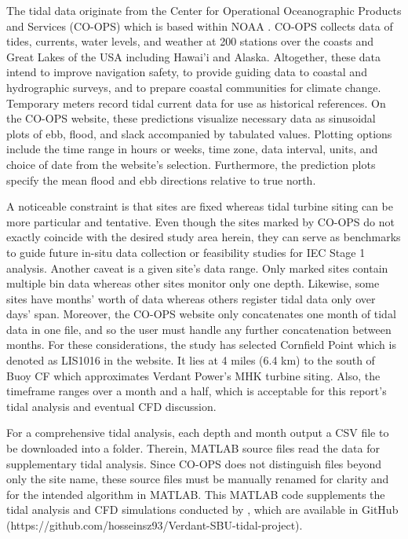 \documentclass[12pt,sort&compress]{elsarticle}
\theoremstyle{definition}%
\begin{document}
The tidal data originate from the Center for Operational Oceanographic Products and Services (CO-OPS) which is based within NOAA \cite{coops_map}. CO-OPS collects data of tides, currents, water levels, and weather at 200 stations over the coasts and Great Lakes of the USA including Hawai'i and Alaska. Altogether, these data intend to improve navigation safety, to provide guiding data to coastal and hydrographic surveys, and to prepare coastal communities for climate change. Temporary meters record tidal current data for use as historical references. On the CO-OPS website, these predictions visualize necessary data as sinusoidal plots of ebb, flood, and slack accompanied by tabulated values. Plotting options include the time range in hours or weeks, time zone, data interval, units, and choice of date from the website's selection. Furthermore, the prediction plots specify the mean flood and ebb directions relative to true north.

A noticeable constraint is that sites are fixed whereas tidal turbine siting can be more particular and tentative. Even though the sites marked by CO-OPS do not exactly coincide with the desired study area herein, they can serve as benchmarks to guide future in-situ data collection or feasibility studies for IEC Stage 1 analysis. Another caveat is a given site's data range. Only marked sites contain multiple bin data whereas other sites monitor only one depth. Likewise, some sites have months' worth of data whereas others register tidal data only over days' span. Moreover, the CO-OPS website only concatenates one month of tidal data in one file, and so the user must handle any further concatenation between months. For these considerations, the study has selected Cornfield Point which is denoted as LIS1016 in the website. It lies at 4 miles (6.4 km) to the south of Buoy CF which approximates Verdant Power's MHK turbine siting. Also, the timeframe ranges over a month and a half, which is acceptable for this report's tidal analysis and eventual CFD discussion.

For a comprehensive tidal analysis, each depth and month output a CSV file to be downloaded into a folder. Therein, MATLAB source files read the data for supplementary tidal analysis. Since CO-OPS does not distinguish files beyond only the site name, these source files must be manually renamed for clarity and for the intended algorithm in MATLAB. This MATLAB code supplements the tidal analysis and CFD simulations conducted by \citet{husoVP2026}, which are available in GitHub (https://github.com/hosseinsz93/Verdant-SBU-tidal-project). 
\end{document}
